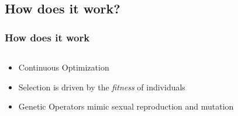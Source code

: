 \documentclass{beamer}
\begin{document}
\subsection[Evolutionary Computation]{How does it work?}

\begin{frame}
	\frametitle{How does it work}
\begin{columns}[T]
\begin{column}{0.6\textwidth}
\begin{itemize}
	\item Continuous Optimization \\
	\item Selection is driven by the \textit{fitness} of individuals
	\item Genetic Operators mimic sexual reproduction and mutation
	

\end{itemize}
\end{column}
\end{columns}
\end{frame}
\end{document}
